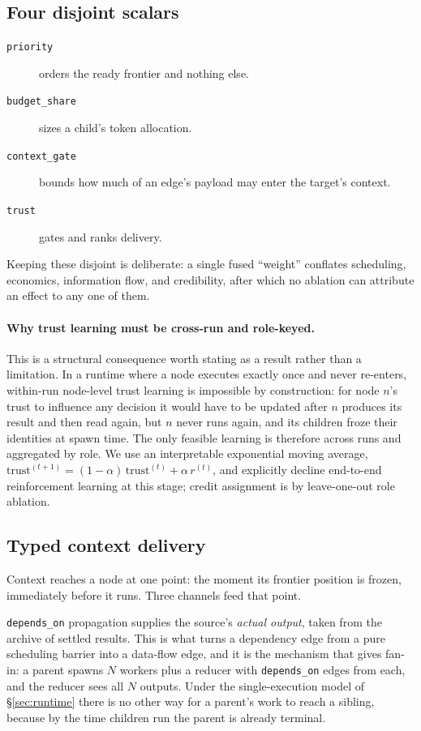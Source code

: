 \documentclass[10pt]{article}
\begin{document}
\subsection{Four disjoint scalars}

\begin{description}
\item[\texttt{priority}] orders the ready frontier and nothing else.
\item[\texttt{budget\_share}] sizes a child's token allocation.
\item[\texttt{context\_gate}] bounds how much of an edge's payload may enter the
      target's context.
\item[\texttt{trust}] gates and ranks delivery.
\end{description}

Keeping these disjoint is deliberate: a single fused ``weight'' conflates
scheduling, economics, information flow, and credibility, after which no
ablation can attribute an effect to any one of them.

\paragraph{Why trust learning must be cross-run and role-keyed.}
This is a structural consequence worth stating as a result rather than a
limitation. In a runtime where a node executes exactly once and never re-enters,
within-run node-level trust learning is impossible by construction: for node
$n$'s trust to influence any decision it would have to be updated after $n$
produces its result and then read again, but $n$ never runs again, and its
children froze their identities at spawn time. The only feasible learning is
therefore across runs and aggregated by role. We use an interpretable
exponential moving average, $\mathrm{trust}^{(t+1)} = (1-\alpha)\,
\mathrm{trust}^{(t)} + \alpha\, r^{(t)}$, and explicitly decline end-to-end
reinforcement learning at this stage; credit assignment is by leave-one-out
role ablation.

\subsection{Typed context delivery}

Context reaches a node at one point: the moment its frontier position is frozen,
immediately before it runs. Three channels feed that point.

\texttt{depends\_on} propagation supplies the source's \emph{actual output},
taken from the archive of settled results. This is what turns a dependency edge
from a pure scheduling barrier into a data-flow edge, and it is the mechanism
that gives fan-in: a parent spawns $N$ workers plus a reducer with
\texttt{depends\_on} edges from each, and the reducer sees all $N$ outputs. Under
the single-execution model of §\ref{sec:runtime} there is no other way for a
parent's work to reach a sibling, because by the time children run the parent is
already terminal.
\end{document}
